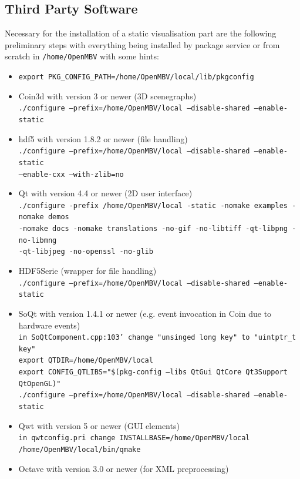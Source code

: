 \subsection{Third Party Software}\label{sec:third_party}
Necessary for the installation of a static visualisation part are the following preliminary steps with everything being installed by package service or from scratch in \texttt{/home/OpenMBV} with some hints:
\begin{itemize}
\item \texttt{export PKG\_CONFIG\_PATH=/home/OpenMBV/local/lib/pkgconfig}
\item Coin3d with version 3 or newer (3D scenegraphs)\\
    \texttt{./configure --prefix=/home/OpenMBV/local --disable-shared --enable-static}
\item hdf5 with version 1.8.2 or newer (file handling)\\
    \texttt{./configure --prefix=/home/OpenMBV/local --disable-shared --enable-static\\ --enable-cxx --with-zlib=no}
\item Qt with version 4.4 or newer (2D user interface)\\
    \texttt{./configure -prefix /home/OpenMBV/local -static -nomake examples -nomake demos\\ -nomake docs -nomake translations -no-gif -no-libtiff -qt-libpng -no-libmng\\ -qt-libjpeg -no-openssl -no-glib}
\item HDF5Serie (wrapper for file handling)\\
    \texttt{./configure --prefix=/home/OpenMBV/local --disable-shared --enable-static}
\item SoQt with version 1.4.1 or newer (e.g. event invocation in Coin due to hardware events)\\
    \texttt{in SoQtComponent.cpp:103' change "unsinged long key" to "uintptr\_t key"}\\
    \texttt{export QTDIR=/home/OpenMBV/local}\\
    \texttt{export CONFIG\_QTLIBS="\$(pkg-config --libs QtGui QtCore Qt3Support QtOpenGL)"}\\
    \texttt{./configure --prefix=/home/OpenMBV/local --disable-shared --enable-static}
\item Qwt with version 5 or newer (GUI elements)\\
    \texttt{in qwtconfig.pri change INSTALLBASE=/home/OpenMBV/local}\\
    \texttt{/home/OpenMBV/local/bin/qmake}
\item Octave with version 3.0 or newer (for XML preprocessing) 
\end{itemize}

